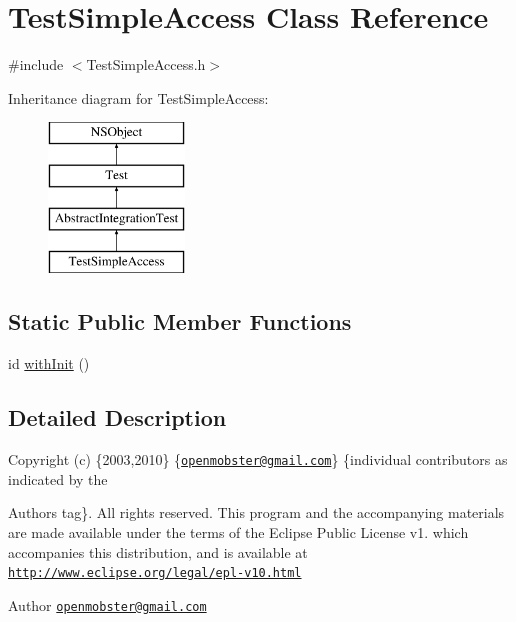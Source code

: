 \hypertarget{interface_test_simple_access}{
\section{\-Test\-Simple\-Access \-Class \-Reference}
\label{interface_test_simple_access}
}


{\ttfamily \#include $<$\-Test\-Simple\-Access.\-h$>$}

\-Inheritance diagram for \-Test\-Simple\-Access\-:\begin{figure}[H]
\begin{center}
\leavevmode
\includegraphics[height=4.000000cm]{interface_test_simple_access}
\end{center}
\end{figure}
\subsection*{\-Static \-Public \-Member \-Functions}
\begin{DoxyCompactItemize}
\item 
id \hyperlink{interface_test_simple_access_a88acfc47f79b02040b91212af9a23077}{with\-Init} ()
\end{DoxyCompactItemize}


\subsection{\-Detailed \-Description}
\-Copyright (c) \{2003,2010\} \{\href{mailto:openmobster@gmail.com}{\tt openmobster@gmail.\-com}\} \{individual contributors as indicated by the \begin{DoxyAuthor}{\-Authors}
tag\}. \-All rights reserved. \-This program and the accompanying materials are made available under the terms of the \-Eclipse \-Public \-License v1. which accompanies this distribution, and is available at \href{http://www.eclipse.org/legal/epl-v10.html}{\tt http\-://www.\-eclipse.\-org/legal/epl-\/v10.\-html}
\end{DoxyAuthor}
\begin{DoxyAuthor}{\-Author}
\href{mailto:openmobster@gmail.com}{\tt openmobster@gmail.\-com} 
\end{DoxyAuthor}



